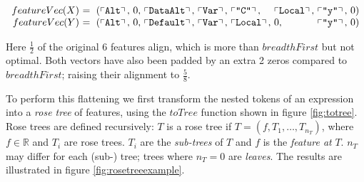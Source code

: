 \begin{small}
  \begin{equation*}\label{eq:flattened}
    \begin{array}{r@{}l@{}l@{}l@{}l@{}l@{}l@{}l@{}l@{}l}
      featureVec(X)\ &=\ (\feature{\CAlt},\ &0,\ &\feature{\CDataAlt},\ &\feature{\CVar},\ &\feature{\id{C}},\  &\feature{\CLocal},\ &\feature{\id{y}},\ &0 &) \\
      featureVec(Y)\ &=\ (\feature{\CAlt},\ &0,\ &\feature{\CDefault},\ &\feature{\CVar},\ &\feature{\CLocal},\ &0,\                 &\feature{\id{y}},\ &0 &)
    \end{array}
  \end{equation*}
\end{small}

Here $\frac{1}{2}$ of the original 6 features align, which is more than $breadthFirst$ but not optimal. Both vectors have also been padded by an extra 2 zeros compared to $breadthFirst$; raising their alignment to $\frac{5}{8}$.

To perform this flattening we first transform the nested tokens of an expression into a \emph{rose tree} of features, using the $toTree$ function shown in figure \ref{fig:totree}. Rose trees are defined recursively: $T$ is a rose tree if $T = (f, T_1, \dots, T_{n_T})$, where $f \in \mathbb{R}$ and $T_i$ are rose trees. $T_i$ are the \emph{sub-trees} of $T$ and $f$ is the \emph{feature at} $T$. $n_T$ may differ for each (sub-) tree; trees where $n_T = 0$ are \emph{leaves}. The results are illustrated in figure \ref{fig:rosetreeexample}.

